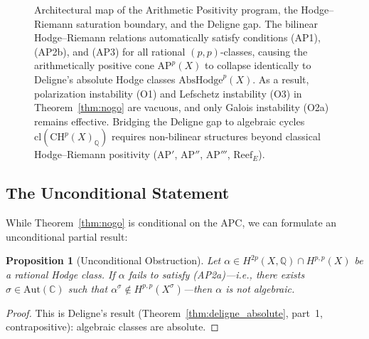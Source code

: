 \documentclass[aps,prd,twocolumn,superscriptaddress,nofootinbib]{revtex4-2}
\newtheorem{proposition}[theorem]{Proposition}
\theoremstyle{definition}
\theoremstyle{remark}
\begin{document}
\begin{figure}[tb]
{}
\caption{Architectural map of the Arithmetic Positivity program, the Hodge--Riemann saturation boundary, and the Deligne gap. The bilinear Hodge--Riemann relations automatically satisfy conditions (AP1), (AP2b), and (AP3) for all rational $(p,p)$-classes, causing the arithmetically positive cone $\mathrm{AP}^p(X)$ to collapse identically to Deligne's absolute Hodge classes $\mathrm{AbsHodge}^p(X)$. As a result, polarization instability (O1) and Lefschetz instability (O3) in Theorem~\ref{thm:nogo} are vacuous, and only Galois instability (O2a) remains effective. Bridging the Deligne gap to algebraic cycles $\mathrm{cl}(\mathrm{CH}^p(X)_\mathbb{Q})$ requires non-bilinear structures beyond classical Hodge--Riemann positivity ($\mathrm{AP}'$, $\mathrm{AP}''$, $\mathrm{AP}'''$, $\mathrm{Reef}_E$).}
\label{fig:ap_saturation_boundary}
\end{figure}

\subsection{The Unconditional Statement}

While Theorem~\ref{thm:nogo} is conditional on the APC, we can formulate an unconditional partial result:

\begin{proposition}[Unconditional Obstruction]
\label{prop:unconditional}
Let $\alpha \in H^{2p}(X, \mathbb{Q}) \cap H^{p,p}(X)$ be a rational Hodge class. If $\alpha$ fails to satisfy (AP2a)---i.e., there exists $\sigma \in \mathrm{Aut}(\mathbb{C})$ such that $\alpha^\sigma \notin H^{p,p}(X^\sigma)$---then $\alpha$ is not algebraic.
\end{proposition}

\begin{proof}
This is Deligne's result (Theorem~\ref{thm:deligne_absolute}, part~1, contrapositive): algebraic classes are absolute.
\end{proof}
\end{document}
